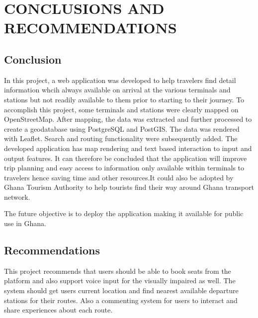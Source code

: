 
\chapter{CONCLUSIONS AND RECOMMENDATIONS} %



\ifpdf
    \graphicspath{{5/figures/PNG/}{5/figures/PDF/}{5/figures/}}
\else
    \graphicspath{{5/figures/EPS/}{5/figures/}}
\fi

\section{Conclusion}
In this project, a web application was developed to help travelers find detail information whcih always available on arrival at the various terminals and stations but not readily available to them prior to starting to their journey. To accomplish this project, some terminals and stations were clearly mapped on OpenStreetMap. After mapping, the data was extracted and further processed to create a geodatabase using PostgreSQL and PostGIS. The data was rendered with Leaflet. Search and routing functionality were subsequently added. The developed application has map rendering and text based interaction to input and output features. It can therefore be concluded that the application will improve trip planning and easy access to information only available within terminals to travelers hence saving time and other resources.It could also be adopted by Ghana Tourism Authority to help tourists find their way around Ghana transport network.

The future objective is to deploy the application making it available for public use in Ghana.

\section{Recommendations}
This project recommends that users should be able to book seats from the platform and also support voice input for the visually impaired as well. The system should get users current location and find nearest available departure stations for their routes. Also a commenting system for users to interact and share experiences about each route.


